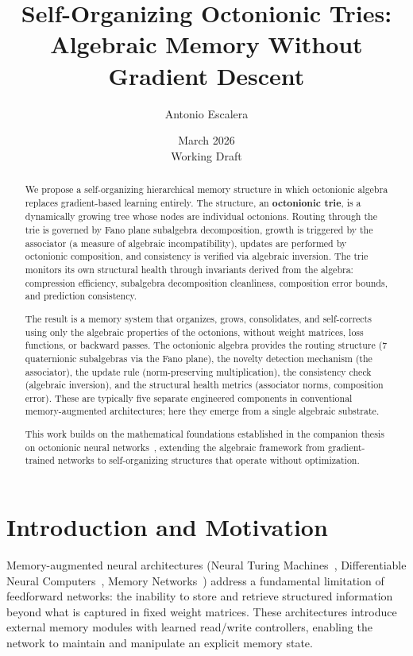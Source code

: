 \documentclass[11pt,a4paper]{article}
\title{Self-Organizing Octonionic Tries:\\Algebraic Memory Without Gradient Descent}
\author{Antonio Escalera}
\date{March 2026\\[0.5em]\normalsize Working Draft}
\theoremstyle{definition}
\theoremstyle{remark}
\begin{document}
\maketitle

\begin{abstract}
We propose a self-organizing hierarchical memory structure in which octonionic algebra replaces gradient-based learning entirely. The structure, an \textbf{octonionic trie}, is a dynamically growing tree whose nodes are individual octonions. Routing through the trie is governed by Fano plane subalgebra decomposition, growth is triggered by the associator (a measure of algebraic incompatibility), updates are performed by octonionic composition, and consistency is verified via algebraic inversion. The trie monitors its own structural health through invariants derived from the algebra: compression efficiency, subalgebra decomposition cleanliness, composition error bounds, and prediction consistency.

The result is a memory system that organizes, grows, consolidates, and self-corrects using only the algebraic properties of the octonions, without weight matrices, loss functions, or backward passes. The octonionic algebra provides the routing structure (7 quaternionic subalgebras via the Fano plane), the novelty detection mechanism (the associator), the update rule (norm-preserving multiplication), the consistency check (algebraic inversion), and the structural health metrics (associator norms, composition error). These are typically five separate engineered components in conventional memory-augmented architectures; here they emerge from a single algebraic substrate.

This work builds on the mathematical foundations established in the companion thesis on octonionic neural networks~\citep{Escalera2026}, extending the algebraic framework from gradient-trained networks to self-organizing structures that operate without optimization.
\end{abstract}

\tableofcontents
\newpage

\section{Introduction and Motivation}
\label{sec:intro}

Memory-augmented neural architectures (Neural Turing Machines~\citep{Graves2014}, Differentiable Neural Computers~\citep{Graves2016}, Memory Networks~\citep{Weston2015}) address a fundamental limitation of feedforward networks: the inability to store and retrieve structured information beyond what is captured in fixed weight matrices. These architectures introduce external memory modules with learned read/write controllers, enabling the network to maintain and manipulate an explicit memory state.
\end{document}
